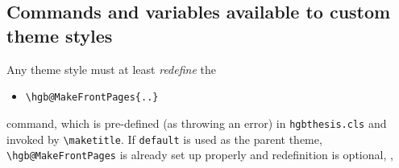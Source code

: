 \documentclass[english]{hgbarticle}
\begin{document}
\subsection{Commands and variables available to custom theme styles}
\label{sec:ThemeStyleCommands}

Any theme style must at least \emph{redefine} the
\begin{itemize}
  \item[] \verb!\hgb@MakeFrontPages{..}!
\end{itemize}
command, which is pre-defined (as throwing an error) in \texttt{hgbthesis.cls}
and invoked by \verb!\maketitle!.
If \texttt{default} is used as the parent theme, \verb!\hgb@MakeFrontPages! 
is already set up properly and redefinition is optional, \ie,
%
\begin{LaTeXCode}[numbers=none]
\renewcommand{\hgb@MakeFrontPages}{..}	%
\end{LaTeXCode}
%
\end{document}
